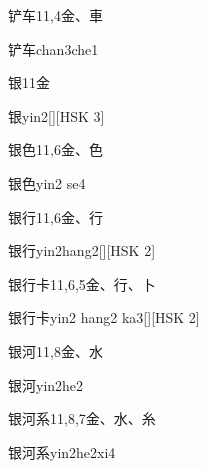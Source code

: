 \begin{entry}{铲车}{11,4}{⾦、⾞}
  \begin{phonetics}{铲车}{chan3che1}
  \end{phonetics}
\end{entry}

\begin{entry}{银}{11}{⾦}
  \begin{phonetics}{银}{yin2}[][HSK 3]
  \end{phonetics}
\end{entry}

\begin{entry}{银色}{11,6}{⾦、⾊}
  \begin{phonetics}{银色}{yin2 se4}
  \end{phonetics}
\end{entry}

\begin{entry}{银行}{11,6}{⾦、⾏}
  \begin{phonetics}{银行}{yin2hang2}[][HSK 2]
  \end{phonetics}
\end{entry}

\begin{entry}{银行卡}{11,6,5}{⾦、⾏、⼘}
  \begin{phonetics}{银行卡}{yin2 hang2 ka3}[][HSK 2]
  \end{phonetics}
\end{entry}

\begin{entry}{银河}{11,8}{⾦、⽔}
  \begin{phonetics}{银河}{yin2he2}
  \end{phonetics}
\end{entry}

\begin{entry}{银河系}{11,8,7}{⾦、⽔、⽷}
  \begin{phonetics}{银河系}{yin2he2xi4}
  \end{phonetics}
\end{entry}

